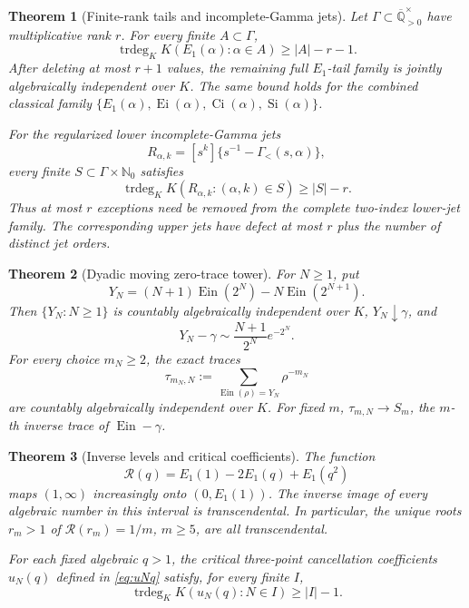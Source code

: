 \documentclass[11pt]{article}
\theoremstyle{keio}
\newtheorem{theorem}{Theorem}[section]
\theoremstyle{definition}
\theoremstyle{remark}
\newcommand{\Qbar}{\overline{\mathbb Q}}
\newcommand{\N}{\mathbb N}
\newcommand{\Ein}{\operatorname{Ein}}
\newcommand{\Ei}{\operatorname{Ei}}
\newcommand{\Ci}{\operatorname{Ci}}
\newcommand{\trdeg}{\operatorname{trdeg}}
\begin{document}
\begin{theorem}[Finite-rank tails and incomplete-Gamma jets]
\label{thm:intro-tail-closures}
Let \(\Gamma\subset\Qbar_{>0}^{\times}\) have multiplicative rank \(r\).
For every finite \(A\subset\Gamma\),
\[
 \trdeg_KK(E_1(\alpha):\alpha\in A)\ge |A|-r-1.
\]
After deleting at most \(r+1\) values, the remaining full \(E_1\)-tail
family is jointly algebraically independent over \(K\).  The same bound
holds for the combined classical family
\(\{E_1(\alpha),\Ei(\alpha),\Ci(\alpha),\operatorname{Si}(\alpha)\}\).

For the regularized lower incomplete-Gamma jets
\[
 R_{\alpha,k}=[s^k]\{s^{-1}-\Gamma_{<}(s,\alpha)\},
\]
every finite \(S\subset\Gamma\times\N_0\) satisfies
\[
 \trdeg_KK(R_{\alpha,k}:(\alpha,k)\in S)\ge |S|-r.
\]
Thus at most \(r\) exceptions need be removed from the complete two-index
lower-jet family.  The corresponding upper jets have defect at most
\(r\) plus the number of distinct jet orders.
\end{theorem}

\begin{theorem}[Dyadic moving zero-trace tower]
\label{thm:intro-dyadic}
For \(N\ge1\), put
\[
 Y_N=(N+1)\Ein(2^N)-N\Ein(2^{N+1}).
\]
Then \(\{Y_N:N\ge1\}\) is countably algebraically independent over \(K\),
\(Y_N\downarrow\gamma\), and
\[
 Y_N-\gamma\sim \frac{N+1}{2^N}e^{-2^N}.
\]
For every choice \(m_N\ge2\), the exact traces
\[
 \tau_{m_N,N}:=\sum_{\Ein(\rho)=Y_N}\rho^{-m_N}
\]
are countably algebraically independent over \(K\).  For fixed \(m\),
\(\tau_{m,N}\to S_m\), the \(m\)-th inverse trace of \(\Ein-\gamma\).
\end{theorem}

\begin{theorem}[Inverse levels and critical coefficients]
\label{thm:intro-inverse}
The function
\[
 \mathscr R(q)=E_1(1)-2E_1(q)+E_1(q^2)
\]
maps \((1,\infty)\) increasingly onto \((0,E_1(1))\).  The inverse image of
every algebraic number in this interval is transcendental.  In particular,
the unique roots \(r_m>1\) of \(\mathscr R(r_m)=1/m\), \(m\ge5\), are all
transcendental.

For each fixed algebraic \(q>1\), the critical three-point cancellation
coefficients \(u_N(q)\) defined in \eqref{eq:uNq} satisfy, for every finite
\(I\),
\[
 \trdeg_KK(u_N(q):N\in I)\ge |I|-1.
\]
\end{theorem}
\end{document}
